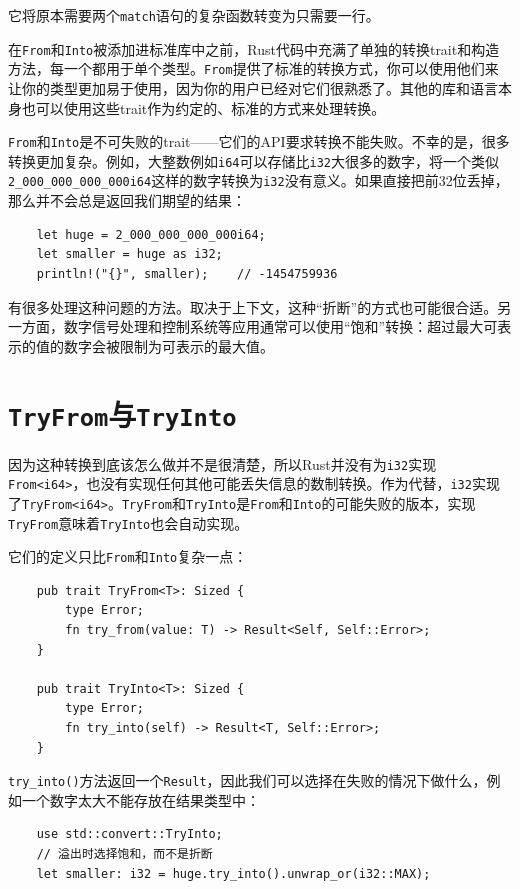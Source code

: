 它将原本需要两个\texttt{match}语句的复杂函数转变为只需要一行。

在\texttt{From}和\texttt{Into}被添加进标准库中之前，Rust代码中充满了单独的转换trait和构造方法，每一个都用于单个类型。\texttt{From}提供了标准的转换方式，你可以使用他们来让你的类型更加易于使用，因为你的用户已经对它们很熟悉了。其他的库和语言本身也可以使用这些trait作为约定的、标准的方式来处理转换。

\texttt{From}和\texttt{Into}是不可失败的trait——它们的API要求转换不能失败。不幸的是，很多转换更加复杂。例如，大整数例如\texttt{i64}可以存储比\texttt{i32}大很多的数字，将一个类似\texttt{2\_000\_000\_000\_000i64}这样的数字转换为\texttt{i32}没有意义。如果直接把前32位丢掉，那么并不会总是返回我们期望的结果：
\begin{verbatim}
    let huge = 2_000_000_000_000i64;
    let smaller = huge as i32;
    println!("{}", smaller);    // -1454759936
\end{verbatim}

有很多处理这种问题的方法。取决于上下文，这种“折断”的方式也可能很合适。另一方面，数字信号处理和控制系统等应用通常可以使用“饱和”转换：超过最大可表示的值的数字会被限制为可表示的最大值。

\section{\texttt{TryFrom}与\texttt{TryInto}}\label{tryfrom}

因为这种转换到底该怎么做并不是很清楚，所以Rust并没有为\texttt{i32}实现\texttt{From<i64>}，也没有实现任何其他可能丢失信息的数制转换。作为代替，\texttt{i32}实现了\texttt{TryFrom<i64>}。\texttt{TryFrom}和\texttt{TryInto}是\texttt{From}和\texttt{Into}的可能失败的版本，实现\texttt{TryFrom}意味着\texttt{TryInto}也会自动实现。

它们的定义只比\texttt{From}和\texttt{Into}复杂一点：
\begin{verbatim}
    pub trait TryFrom<T>: Sized {
        type Error;
        fn try_from(value: T) -> Result<Self, Self::Error>;
    }

    pub trait TryInto<T>: Sized {
        type Error;
        fn try_into(self) -> Result<T, Self::Error>;
    }
\end{verbatim}

\texttt{try\_into()}方法返回一个\texttt{Result}，因此我们可以选择在失败的情况下做什么，例如一个数字太大不能存放在结果类型中：
\begin{verbatim}
    use std::convert::TryInto;
    // 溢出时选择饱和，而不是折断
    let smaller: i32 = huge.try_into().unwrap_or(i32::MAX);
\end{verbatim}

